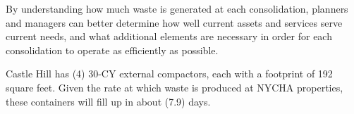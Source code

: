 
    By understanding how much waste is generated at each consolidation, planners and managers
    can better determine how well current assets and services serve current needs, and what additional 
    elements are necessary in order for each consolidation to operate as efficiently as possible. 

    Castle Hill has (4) 30-CY external compactors, each with a footprint of 192 square feet. Given the rate at which waste is produced at NYCHA properties, these containers will fill
    up in about (7.9) days.